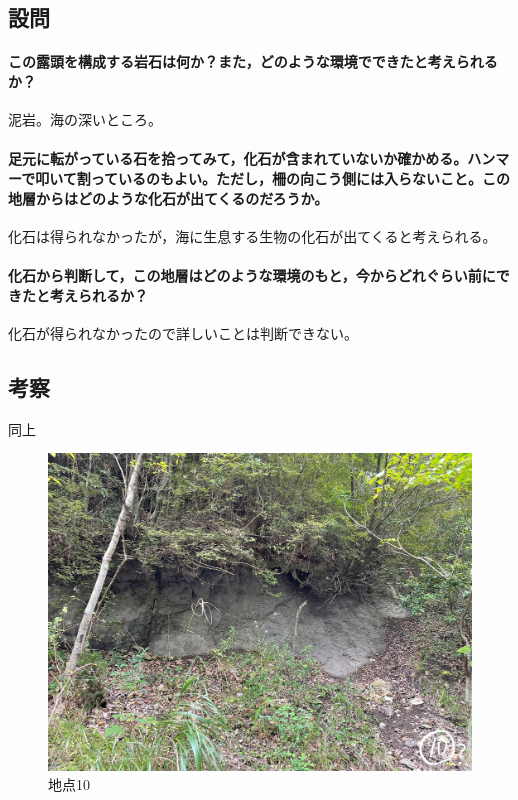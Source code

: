 \documentclass[uplatex,b5paper]{jsreport}
\begin{document}
    \subsection{設問}
      \paragraph{この露頭を構成する岩石は何か？また，どのような環境でできたと考えられるか？}
      泥岩。海の深いところ。
      \paragraph{足元に転がっている石を拾ってみて，化石が含まれていないか確かめる。ハンマーで叩いて割っているのもよい。ただし，柵の向こう側には入らないこと。この地層からはどのような化石が出てくるのだろうか。}
      化石は得られなかったが，海に生息する生物の化石が出てくると考えられる。
      \paragraph{化石から判断して，この地層はどのような環境のもと，今からどれぐらい前にできたと考えられるか？}
      化石が得られなかったので詳しいことは判断できない。
    \subsection{考察}
    同上
  \begin{figure}[h]
    \begin{center}
      \includegraphics[scale=0.13]{files/地学実習/地点10.jpg}
      \caption{地点10}
    \end{center}    
  \end{figure}
  \clearpage
\end{document}
